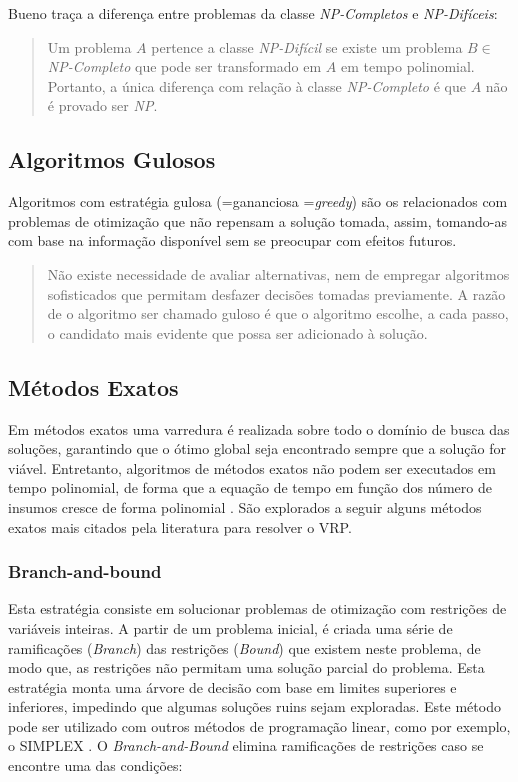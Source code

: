 Bueno traça a diferença entre problemas da classe \emph{NP-Completos} e \emph{NP-Difíceis}:

\begin{quote}
Um problema $A$ pertence a classe \emph{NP-Difícil} se existe um problema $B \in$ \emph{NP-Completo} que pode ser transformado em $A$ em tempo polinomial. Portanto, a única diferença com relação à classe \emph{NP-Completo} é que $A$ não é provado ser \emph{NP}.
\end{quote}

\subsection{Algoritmos Gulosos}
\label{gulosos}
Algoritmos com estratégia gulosa (=gananciosa =\emph{greedy}) \cite{feofiloff} são os relacionados com problemas de otimização que não repensam a solução tomada, assim, tomando-as com base na informação disponível sem se preocupar com efeitos futuros. 

\begin{quote}
Não existe necessidade de avaliar alternativas, nem de empregar algoritmos sofisticados que permitam desfazer decisões tomadas previamente. A razão de o algoritmo ser chamado guloso é que o algoritmo escolhe, a cada passo, o candidato mais evidente que possa ser adicionado à solução.
\end{quote}

\subsection{Métodos Exatos} \label{metodos-exatos}

Em métodos exatos uma varredura é realizada sobre todo o domínio de busca das soluções, garantindo que o ótimo global seja encontrado sempre que a solução for viável. Entretanto, algoritmos de métodos exatos não podem ser executados em tempo polinomial, de forma que a equação de tempo em função dos número de insumos cresce de forma polinomial \cite{maxwell}. São explorados a seguir alguns métodos exatos mais citados pela literatura para resolver o VRP.

\subsubsection{Branch-and-bound}
Esta estratégia consiste em solucionar problemas de otimização com restrições de variáveis inteiras. A partir de um problema inicial, é criada uma série de ramificações (\emph{Branch}) das restrições (\emph{Bound}) que existem neste problema, de modo que, as restrições não permitam uma solução parcial do problema. Esta estratégia monta uma árvore de decisão com base em limites superiores e inferiores, impedindo que algumas soluções ruins sejam exploradas. Este método pode ser utilizado com outros métodos de programação linear, como por exemplo, o SIMPLEX \cite{LAPORTE1992345}. O \emph{Branch-and-Bound} elimina ramificações de restrições caso se encontre uma das condições:

